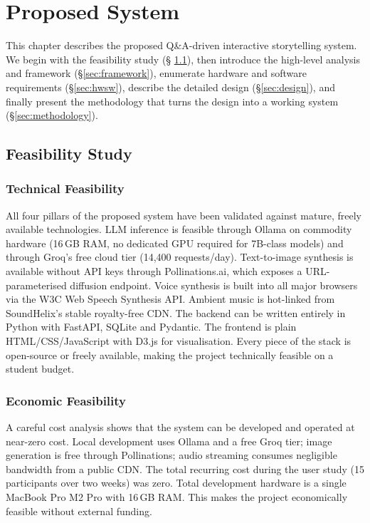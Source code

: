 \chapter{Proposed System}
\label{ch:proposed}

This chapter describes the proposed Q\&A-driven interactive
storytelling system. We begin with the feasibility study (\S
\ref{sec:feasibility}), then introduce the high-level analysis and
framework (\S\ref{sec:framework}), enumerate hardware and software
requirements (\S\ref{sec:hwsw}), describe the detailed design
(\S\ref{sec:design}), and finally present the methodology that turns
the design into a working system (\S\ref{sec:methodology}).

\section{Feasibility Study}
\label{sec:feasibility}

\subsection{Technical Feasibility}
All four pillars of the proposed system have been validated against
mature, freely available technologies. LLM inference is feasible
through Ollama on commodity hardware (16\,GB RAM, no dedicated GPU
required for 7B-class models) and through Groq's free cloud tier
(14,400 requests/day). Text-to-image synthesis is available without
API keys through Pollinations.ai, which exposes a
URL-parameterised diffusion endpoint. Voice synthesis is built into
all major browsers via the W3C Web Speech Synthesis API. Ambient
music is hot-linked from SoundHelix's stable royalty-free CDN. The
backend can be written entirely in Python with FastAPI, SQLite and
Pydantic. The frontend is plain HTML/CSS/JavaScript with D3.js for
visualisation. Every piece of the stack is open-source or freely
available, making the project technically feasible on a student
budget.

\subsection{Economic Feasibility}
A careful cost analysis shows that the system can be developed and
operated at near-zero cost. Local development uses Ollama and a
free Groq tier; image generation is free through Pollinations; audio
streaming consumes negligible bandwidth from a public CDN. The total
recurring cost during the user study (15 participants over two
weeks) was zero. Total development hardware is a single MacBook Pro
M2 Pro with 16\,GB RAM. This makes the project economically feasible
without external funding.

